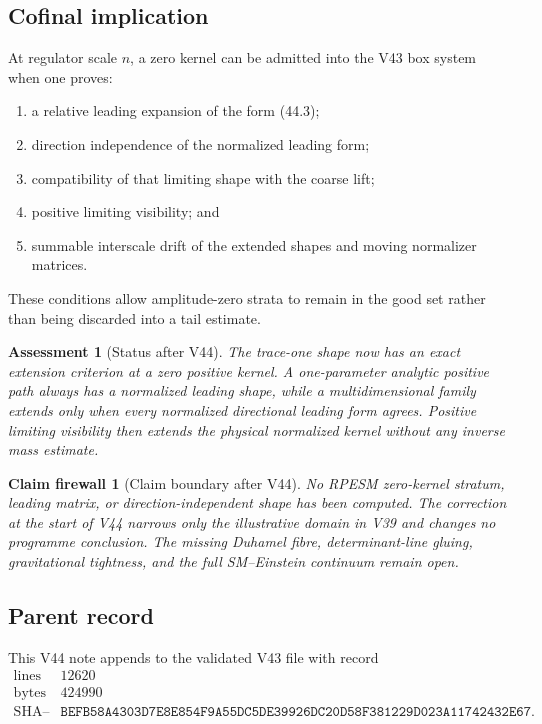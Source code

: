 \documentclass[11pt]{article}
\newtheorem{firewall}[theorem]{Claim firewall}
\newtheorem{assessment}[theorem]{Assessment}
\theoremstyle{remark}
\begin{document}
\subsection{Cofinal implication}

At regulator scale \(n\), a zero kernel can be admitted into the V43
box system when one proves:
\begin{enumerate}
\item a relative leading expansion of the form (44.3);
\item direction independence of the normalized leading form;
\item compatibility of that limiting shape with the coarse lift;
\item positive limiting visibility; and
\item summable interscale drift of the extended shapes and moving
normalizer matrices.
\end{enumerate}
These conditions allow amplitude-zero strata to remain in the good
set rather than being discarded into a tail estimate.

\begin{assessment}[Status after V44]
\label{ass:v12v44-status}
The trace-one shape now has an exact extension criterion at a zero
positive kernel.  A one-parameter analytic positive path always has
a normalized leading shape, while a multidimensional family extends
only when every normalized directional leading form agrees.
Positive limiting visibility then extends the physical normalized
kernel without any inverse mass estimate.
\end{assessment}

\begin{firewall}[Claim boundary after V44]
\label{fire:v12v44-claim}
No RPESM zero-kernel stratum, leading matrix, or direction-independent
shape has been computed.  The correction at the start of V44 narrows
only the illustrative domain in V39 and changes no programme
conclusion.  The missing Duhamel fibre, determinant-line gluing,
gravitational tightness, and the full SM--Einstein continuum remain
open.
\end{firewall}

\subsection{Parent record}

This V44 note appends to the validated V43 file with record
\[
\begin{array}{c|c}
\text{lines}&12620\\
\text{bytes}&424990\\
\text{SHA--256}&
\texttt{BEFB58A4303D7E8E854F9A55DC5DE39926DC20D58F381229D023A11742432E67}.
\end{array}
\]
\end{document}
